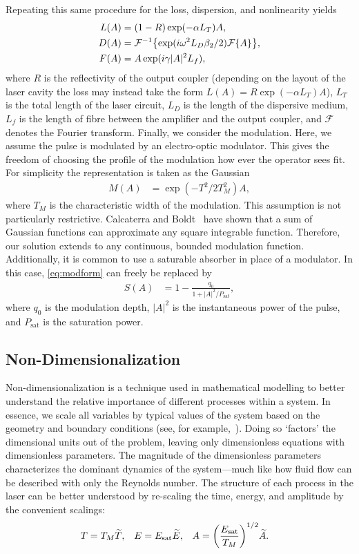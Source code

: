 \documentclass[9pt,twocolumn,twoside]{osajnl}
\let\originalleft\left
\let\originalright\right
\renewcommand{\left}{\mathopen{}\mathclose\bgroup\originalleft}
\renewcommand{\right}{\aftergroup\egroup\originalright}
\newcommand{\Es}{E_{\textrm{sat}}} %
\newcommand{\FT}[1]{\mathcal{F}\left\{ #1 \right\}} %
\newcommand{\FTi}[1]{\mathcal{F}^{-1}\left\{ #1 \right\}} %
\begin{document}
Repeating this same procedure for the loss, dispersion, and nonlinearity yields
\begin{align}
	L(A) &= (1 - R) \exp( - \alpha L_T )A, \\
	D(A) &= \FTi{\exp( i \omega^2 L_D\beta_2/2 ) \FT{A}}, \\
	F(A) &= A \exp( i \gamma |A|^2 L_f ),
\end{align}
where $R$ is the reflectivity of the output coupler (depending on the layout of the laser cavity the loss may instead take the form $L(A) = R \exp( - \alpha L_T )A$), $L_T$ is the total length of the laser circuit, $L_D$ is the length of the dispersive medium, $L_f$ is the length of fibre between the amplifier and the output coupler, and $\mathcal{F}$ denotes the Fourier transform. Finally, we consider the modulation. Here, we assume the pulse is modulated by an electro-optic modulator. This gives the freedom of choosing the profile of the modulation how ever the operator sees fit. For simplicity the representation is taken as the Gaussian
\begin{align}
	M(A) &= \exp( -T^2 / 2 T_M^2 ) A,
	\label{eq:modform}
\end{align}
where $T_M$ is the characteristic width of the modulation. This assumption is not particularly restrictive. Calcaterra and Boldt~\cite{calcaterra2008a} have shown that a sum of Gaussian functions can approximate any square integrable function. Therefore, our solution extends to any continuous, bounded modulation function. Additionally, it is common to use a saturable absorber in place of a modulator. In this case, \eqref{eq:modform} can freely be replaced by~\cite{lapre2019, meng2020}
\begin{align}
	S(A) &= 1 - \frac{q_0}{1 + |A|^2 / P_\text{sat}},
\end{align}
where $q_0$ is the modulation depth, $|A|^2$ is the instantaneous power of the pulse, and $P_\text{sat}$ is the saturation power.

\subsection{Non-Dimensionalization}
Non-dimensionalization is a technique used in mathematical modelling to better understand the relative importance of different processes within a system. In essence, we scale all variables by typical values of the system based on the geometry and boundary conditions (see, for example,~\cite{howison2005}). Doing so `factors' the dimensional units out of the problem, leaving only dimensionless equations with dimensionless parameters. The magnitude of the dimensionless parameters characterizes the dominant dynamics of the system---much like how fluid flow can be described with only the Reynolds number. The structure of each process in the laser can be better understood by re-scaling the time, energy, and amplitude by the convenient scalings:
\begin{align}
	T &= T_M \widetilde{T},& E &= \Es \widetilde{E},& A &= \left( \frac{\Es}{T_M} \right)^{1/2} \widetilde{A}.
\end{align}
\end{document}
